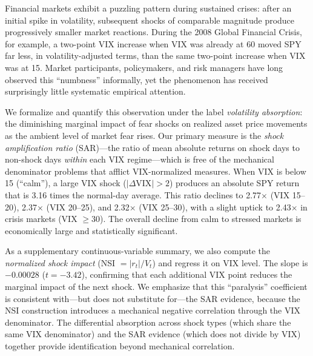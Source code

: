\documentclass[12pt,a4paper]{article}
\begin{document}
Financial markets exhibit a puzzling pattern during sustained crises: after an initial spike in volatility, subsequent shocks of comparable magnitude produce progressively smaller market reactions. During the 2008 Global Financial Crisis, for example, a two-point VIX increase when VIX was already at 60 moved SPY far less, in volatility-adjusted terms, than the same two-point increase when VIX was at 15. Market participants, policymakers, and risk managers have long observed this ``numbness'' informally, yet the phenomenon has received surprisingly little systematic empirical attention.

We formalize and quantify this observation under the label \textit{volatility absorption}: the diminishing marginal impact of fear shocks on realized asset price movements as the ambient level of market fear rises. Our primary measure is the \textit{shock amplification ratio} (SAR)---the ratio of mean absolute returns on shock days to non-shock days \textit{within} each VIX regime---which is free of the mechanical denominator problems that afflict VIX-normalized measures. When VIX is below 15 (``calm''), a large VIX shock ($|\Delta\text{VIX}| > 2$) produces an absolute SPY return that is 3.16 times the normal-day average. This ratio declines to 2.77$\times$ (VIX 15--20), 2.37$\times$ (VIX 20--25), and 2.32$\times$ (VIX 25--30), with a slight uptick to 2.43$\times$ in crisis markets (VIX $\geq 30$). The overall decline from calm to stressed markets is economically large and statistically significant.

As a supplementary continuous-variable summary, we also compute the \textit{normalized shock impact} (NSI $= |r_t|/V_t$) and regress it on VIX level. The slope is $-0.00028$ ($t = -3.42$), confirming that each additional VIX point reduces the marginal impact of the next shock. We emphasize that this ``paralysis'' coefficient is consistent with---but does not substitute for---the SAR evidence, because the NSI construction introduces a mechanical negative correlation through the VIX denominator. The differential absorption across shock types (which share the same VIX denominator) and the SAR evidence (which does not divide by VIX) together provide identification beyond mechanical correlation.
\end{document}
